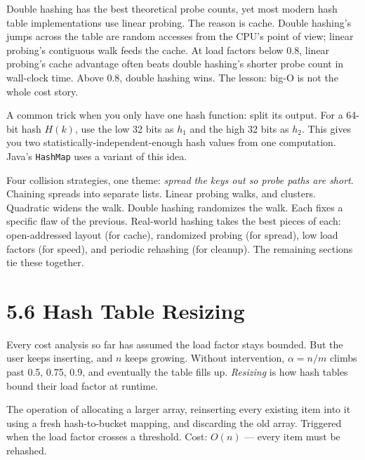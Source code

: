 \documentclass[11pt]{article}
\begin{document}
\begin{ideabox}
Double hashing has the best theoretical probe counts, yet most
modern hash table implementations use linear probing. The reason
is cache. Double hashing's jumps across the table are random
accesses from the CPU's point of view; linear probing's contiguous
walk feeds the cache. At load factors below 0.8, linear probing's
cache advantage often beats double hashing's shorter probe
count in wall-clock time. Above 0.8, double hashing wins. The
lesson: big-O is not the whole cost story.
\end{ideabox}

\begin{notebox}
A common trick when you only have one hash function: split its
output. For a 64-bit hash $H(k)$, use the low 32 bits as $h_1$
and the high 32 bits as $h_2$. This gives you two
statistically-independent-enough hash values from one computation.
Java's \texttt{HashMap} uses a variant of this idea.
\end{notebox}

\begin{ideabox}
Four collision strategies, one theme: \emph{spread the keys out
so probe paths are short}. Chaining spreads into separate lists.
Linear probing walks, and clusters. Quadratic widens the walk.
Double hashing randomizes the walk. Each fixes a specific flaw
of the previous. Real-world hashing takes the best pieces of
each: open-addressed layout (for cache), randomized probing (for
spread), low load factors (for speed), and periodic rehashing
(for cleanup). The remaining sections tie these together.
\end{ideabox}

\section{5.6 Hash Table Resizing}

Every cost analysis so far has assumed the load factor stays
bounded. But the user keeps inserting, and $n$ keeps growing.
Without intervention, $\alpha = n/m$ climbs past 0.5, 0.75, 0.9,
and eventually the table fills up. \emph{Resizing} is how hash
tables bound their load factor at runtime.

\begin{defnbox}
The operation of allocating a larger array, reinserting every
existing item into it using a fresh hash-to-bucket mapping, and
discarding the old array. Triggered when the load factor crosses
a threshold. Cost: $O(n)$ --- every item must be rehashed.
\end{defnbox}
\end{document}
